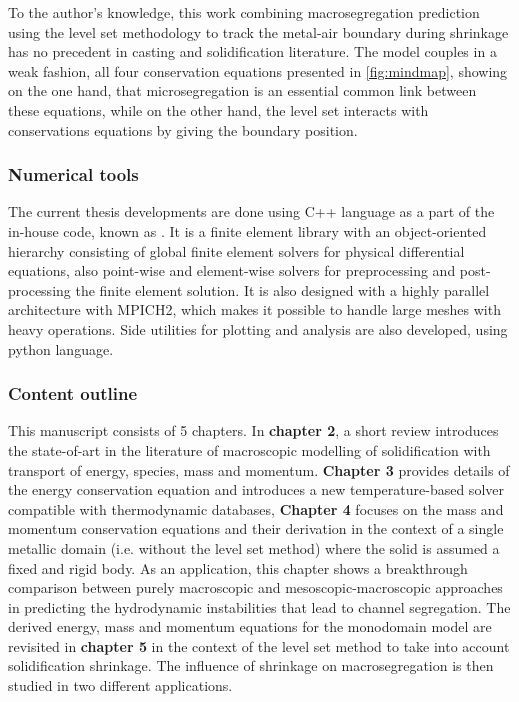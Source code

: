 To the author's knowledge, this work 
combining macrosegregation prediction using the level set methodology to track the metal-air boundary during 
shrinkage has no precedent in casting and solidification literature. The model couples in a weak fashion, all four
conservation equations presented in \cref{fig:mindmap}, showing on the one hand, that microsegregation is an essential 
common link between these equations, while on the other hand, the level set interacts with conservations equations by
giving the boundary position. 
%
\subsubsection{Numerical tools}
The current thesis developments are done using C++ language as a part of the
in-house code, known as \cimlib \citep{digonnet_cimlib:_2007,mesri_advanced_2009}. 
It is a finite element library with an object-oriented hierarchy
consisting of global finite element solvers for physical differential equations, also point-wise and element-wise solvers for 
preprocessing and post-processing the finite element solution. It is also designed with a highly parallel architecture with MPICH2, which makes it possible
to handle large meshes with heavy operations. Side utilities for plotting and analysis
are also developed, using python language.

\subsubsection{Content outline}
This manuscript consists of 5 chapters. In \textbf{chapter 2}, a short review introduces the state-of-art in the literature of 
macroscopic modelling of solidification with transport of energy, species, mass and momentum. \textbf{Chapter 3} provides details
of the energy conservation equation and introduces a new temperature-based solver compatible with thermodynamic databases,
\textbf{Chapter 4} focuses on the mass and momentum conservation equations 
and their derivation in the context of a single metallic domain (i.e. without 
the level set method) where the solid is assumed a fixed and rigid body. As an 
application, this chapter shows a breakthrough comparison between purely macroscopic 
and mesoscopic-macroscopic approaches in predicting the hydrodynamic instabilities 
that lead to channel segregation.
The derived energy, mass and momentum equations for the monodomain model are revisited 
in \textbf{chapter 5} in the context of the level set method to take into account solidification shrinkage.
The influence of shrinkage on macrosegregation is then studied in two different applications.

